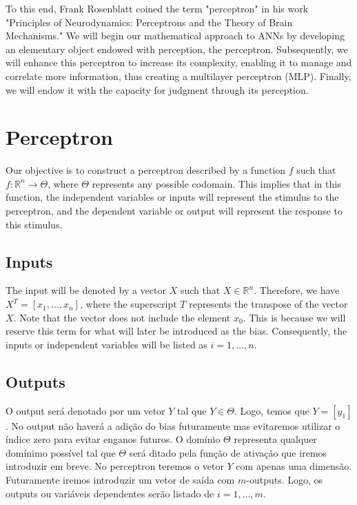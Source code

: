 \documentclass{article}
\begin{document}
To this end, Frank Rosenblatt coined the term "perceptron" in his work "Principles of Neurodynamics: Perceptrons and the Theory of Brain Mechanisms." We will begin our mathematical approach to ANNs by developing an elementary object endowed with perception, the perceptron. Subsequently, we will enhance this perceptron to increase its complexity, enabling it to manage and correlate more information, thus creating a multilayer perceptron (MLP). Finally, we will endow it with the capacity for judgment through its perception.


\section{Perceptron}
Our objective is to construct a perceptron described by a function \(f\) such that \(f: \mathbb{R}^n \rightarrow \Theta\), where \(\Theta\) represents any possible codomain. This implies that in this function, the independent variables or inputs will represent the stimulus to the perceptron, and the dependent variable or output will represent the response to this stimulus.

\subsection[]{Inputs}

The input will be denoted by a vector \(X\) such that \(X \in \mathbb{R}^n\). Therefore, we have \(X^T = [x_1, \dots, x_n]\), where the superscript \(T\) represents the transpose of the vector \(X\). Note that the vector does not include the element \(x_0\). This is because we will reserve this term for what will later be introduced as the bias. Consequently, the inputs or independent variables will be listed as \(i=1, \dots, n\).

\subsection[]{Outputs}

O output será denotado por um vetor \(Y\) tal que \(Y \in \Theta\). Logo, temos que \(Y = [y_1]\). No output não haverá a adição do bias futuramente mas evitaremos utilizar o índice zero para evitar enganos futuros. O domínio \(\Theta\) representa qualquer domínimo possível tal que \(\Theta\) será ditado pela função de ativação que iremos introduzir em breve. No perceptron teremos o vetor \(Y\) com apenas uma dimensão. Futuramente iremos introduzir um vetor de saída com \(m\)-outputs. Logo, os outputs ou variáveis dependentes serão listado de \(i=1, \dots, m\).
\end{document}

